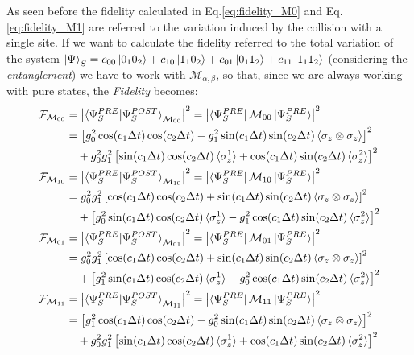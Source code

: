 \documentclass[a4paper,12pt]{article}
\begin{document}
As seen before the fidelity calculated in Eq.\ref{eq:fidelity_M0} and Eq.\ref{eq:fidelity_M1} are referred to the variation induced by the collision with a single site. If we want to calculate the fidelity referred to the total variation of the system $ \ket{\Psi}_{S} = c_{00} \ket{0_{1}0_{2}} + c_{10} \ket{1_{1}0_{2}} + c_{01} \ket{0_{1}1_{2}} + c_{11} \ket{1_{1}1_{2}} $ (considering the \textit{entanglement}) we have to work with $ \mathcal{M}_{\alpha, \beta} $, so that, since we are always working with pure states, the \textit{Fidelity} becomes:
\begin{align}
	\mathcal{F}_{\mathcal{M}_{00}} &= \left| \braket{\Psi_{S}^{PRE} | \Psi_{S}^{POST}}_{\mathcal{M}_{00}} \right|^2 = \left| \bra{\Psi_{S}^{PRE}}\mathcal{M}_{00} \ket{\Psi_{S}^{PRE}} \right|^2 \notag \\
	&= \left[ g_0^2 \cos(c_1 \Delta t) \cos(c_2 \Delta t) - g_1^2 \sin(c_1 \Delta t) \sin(c_2 \Delta t) \braket{\sigma_z \otimes \sigma_z} \right]^2 \notag \\
	&\quad + g_0^2 g_1^2 \left[ \sin(c_1 \Delta t) \cos(c_2 \Delta t) \braket{\sigma_z^1} + \cos(c_1 \Delta t) \sin(c_2 \Delta t) \braket{\sigma_z^2} \right]^2 \label{eq:fidelity_M00_general} \\
	\mathcal{F}_{\mathcal{M}_{10}} &= \left| \braket{\Psi_{S}^{PRE} | \Psi_{S}^{POST}}_{\mathcal{M}_{10}} \right|^2 = \left| \bra{\Psi_{S}^{PRE}}\mathcal{M}_{10} \ket{\Psi_{S}^{PRE}} \right|^2 \notag \\
	&= g_0^2 g_1^2 \left[ \cos(c_1 \Delta t) \cos(c_2 \Delta t) + \sin(c_1 \Delta t) \sin(c_2 \Delta t) \braket{\sigma_z \otimes \sigma_z} \right]^2 \notag \\
	&\quad + \left[ g_0^2 \sin(c_1 \Delta t) \cos(c_2 \Delta t) \braket{\sigma_z^1} - g_1^2 \cos(c_1 \Delta t) \sin(c_2 \Delta t) \braket{\sigma_z^2} \right]^2 \label{eq:fidelity_M10_general} \\
	\mathcal{F}_{\mathcal{M}_{01}} &= \left| \braket{\Psi_{S}^{PRE} | \Psi_{S}^{POST}}_{\mathcal{M}_{01}} \right|^2 = \left| \bra{\Psi_{S}^{PRE}}\mathcal{M}_{01} \ket{\Psi_{S}^{PRE}} \right|^2 \notag \\
	&= g_0^2 g_1^2 \left[ \cos(c_1 \Delta t) \cos(c_2 \Delta t) + \sin(c_1 \Delta t) \sin(c_2 \Delta t) \braket{\sigma_z \otimes \sigma_z} \right]^2 \notag \\
	&\quad + \left[ g_1^2 \sin(c_1 \Delta t) \cos(c_2 \Delta t) \braket{\sigma_z^1} - g_0^2 \cos(c_1 \Delta t) \sin(c_2 \Delta t) \braket{\sigma_z^2} \right]^2 \label{eq:fidelity_M01_general} \\
	\mathcal{F}_{\mathcal{M}_{11}} &= \left| \braket{\Psi_{S}^{PRE} | \Psi_{S}^{POST}}_{\mathcal{M}_{11}} \right|^2 = \left| \bra{\Psi_{S}^{PRE}}\mathcal{M}_{11} \ket{\Psi_{S}^{PRE}} \right|^2 \notag \\
	&= \left[ g_1^2 \cos(c_1 \Delta t) \cos(c_2 \Delta t) - g_0^2 \sin(c_1 \Delta t) \sin(c_2 \Delta t) \braket{\sigma_z \otimes \sigma_z} \right]^2 \notag \\
	&\quad + g_0^2 g_1^2 \left[ \sin(c_1 \Delta t) \cos(c_2 \Delta t) \braket{\sigma_z^1} + \cos(c_1 \Delta t) \sin(c_2 \Delta t) \braket{\sigma_z^2} \right]^2 \label{eq:fidelity_M11_general}
\end{align}
\end{document}

